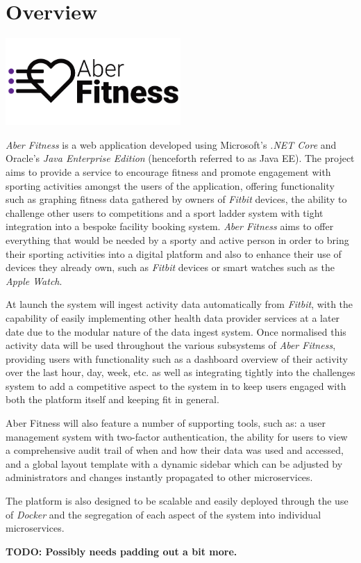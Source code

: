 \chapter{Overview}

\begin{center}
	\includegraphics[width=0.5\textwidth]{Images/aberfitness.png}
\end{center}

\textit{Aber Fitness} is a web application developed using Microsoft's \textit{.NET Core} and Oracle's \textit{Java Enterprise Edition} (henceforth referred to as Java EE). The project aims to provide a service to encourage fitness and promote engagement with sporting activities amongst the users of the application, offering functionality such as graphing fitness data gathered by owners of \textit{Fitbit} devices, the ability to challenge other users to competitions and a sport ladder system with tight integration into a bespoke facility booking system. \textit{Aber Fitness} aims to offer everything that would be needed by a sporty and active person in order to bring their sporting activities into a digital platform and also to enhance their use of devices they already own, such as \textit{Fitbit} devices or smart watches such as the \textit{Apple Watch}.

At launch the system will ingest activity data automatically from \textit{Fitbit}, with the capability of easily implementing other health data provider services at a later date due to the modular nature of the data ingest system. Once normalised this activity data will be used throughout the various subsystems of \textit{Aber Fitness}, providing users with functionality such as a dashboard overview of their activity over the last hour, day, week, etc. as well as integrating tightly into the challenges system to add a competitive aspect to the system in to keep users engaged with both the platform itself and keeping fit in general. 

Aber Fitness will also feature a number of supporting tools, such as: a user management system with two-factor authentication, the ability for users to view a comprehensive audit trail of when and how their data was used and accessed, and a global layout template with a dynamic sidebar which can be adjusted by administrators and changes instantly propagated to other microservices. 

The platform is also designed to be scalable and easily deployed through the use of \textit{Docker} and the segregation of each aspect of the system into individual microservices. 

\textbf{TODO: Possibly needs padding out a bit more.}